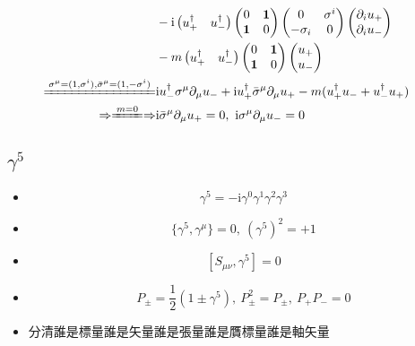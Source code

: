 \documentclass{article}
\begin{document}
$$\begin{aligned}
    \\ & -\mathrm{i}\begin{pmatrix}
      u_+^{\dagger} & u_-^{\dagger}
    \end{pmatrix}\begin{pmatrix}
      0 & \bf{1} \\\bf{1} & 0
    \end{pmatrix}\begin{pmatrix}
      0 & \sigma^i \\-\sigma_i & 0
    \end{pmatrix}\begin{pmatrix}
      \partial_iu_+ \\\partial_i u_-
    \end{pmatrix}
    \\ & -m\begin{pmatrix}
      u_+^{\dagger} & u_-^{\dagger}
    \end{pmatrix}\begin{pmatrix}
      0 & \bf{1} \\\bf{1} & 0
    \end{pmatrix}\begin{pmatrix}
      u_+ \\u_-
    \end{pmatrix}\\
    \xlongequal{\sigma^{\mu}=(1,\sigma^i),\bar{\sigma}^{\mu}=(1,-\sigma^i)} & \mathrm{i}u_-^{\dagger}\sigma^{\mu}\partial_{\mu}u_-+\mathrm{i}u_+^{\dagger}\bar{\sigma}^{\mu}\partial_{\mu}u_{+}-m(u_+^{\dagger}u_-+u_-^{\dagger}u_+)                                             \\
    \Rightarrow\xlongequal{m=0}\Rightarrow                                  & \mathrm{i}\bar{\sigma}^{\mu}\partial_{\mu}u_+=0,\ \mathrm{i}\sigma^{\mu}\partial_{\mu}u_-=0
  \end{aligned}
$$

\subsection{$\gamma^5$}

\begin{itemize}
  \item $$\gamma^5=-\mathrm{i}\gamma^0\gamma^1\gamma^2\gamma^3$$
  \item $$\{\gamma^5,\gamma^\mu\}=0,\ (\gamma^5)^2=+1$$
  \item $$[S_{\mu\nu},\gamma^5]=0$$
  \item $$P_{\pm}=\frac{1}{2}(1\pm\gamma^5),\ P_{\pm}^2=P_{\pm},\ P_+P_-=0$$
  \item 分清誰是標量誰是矢量誰是張量誰是贋標量誰是軸矢量
\end{itemize}
\end{document}
